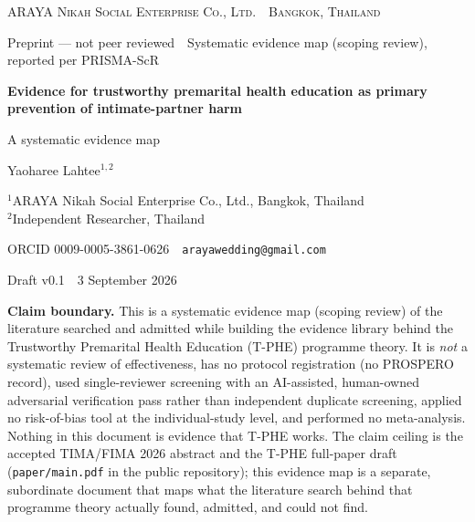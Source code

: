 \documentclass[11pt]{article}
\title{}
\newcommand{\tphe}{T\mbox{-}PHE}
\begin{document}
\begin{center}
{\footnotesize\textsc{ARAYA Nikah Social Enterprise Co., Ltd. \,\textbullet\, Bangkok, Thailand}}\par
{\scriptsize Preprint --- not peer reviewed \,\textbullet\, Systematic evidence map (scoping review), reported per PRISMA-ScR}\par\vspace{4mm}
{\LARGE\bfseries\color{ocsi} Evidence for trustworthy premarital health education as primary prevention of intimate-partner harm}\par\vspace{1.5mm}
{\large A systematic evidence map}\par\vspace{4mm}
{\normalsize Yaoharee Lahtee$^{1,2}$}\par
{\small $^{1}$ARAYA Nikah Social Enterprise Co., Ltd., Bangkok, Thailand\\
$^{2}$Independent Researcher, Thailand}\par
{\small ORCID 0009-0005-3861-0626 \,\textbullet\, \texttt{arayawedding@gmail.com}}\par\vspace{2mm}
{\small Draft v0.1 \,\textbullet\, 3 September 2026}\par
\end{center}

\vspace{3mm}
\noindent\textbf{Claim boundary.} This is a systematic evidence map (scoping review) of the
literature searched and admitted while building the evidence library behind the Trustworthy
Premarital Health Education (\tphe) programme theory. It is \emph{not} a systematic review of
effectiveness, has no protocol registration (no PROSPERO record), used single-reviewer
screening with an AI-assisted, human-owned adversarial verification pass rather than independent
duplicate screening, applied no risk-of-bias tool at the individual-study level, and performed
no meta-analysis. Nothing in this document is evidence that \tphe{} works. The claim ceiling is
the accepted TIMA/FIMA 2026 abstract and the \tphe{} full-paper draft (\texttt{paper\slash{}main.pdf} in the public repository); this evidence map is a separate, subordinate document that maps what the
literature search behind that programme theory actually found, admitted, and could not find.
\end{document}
